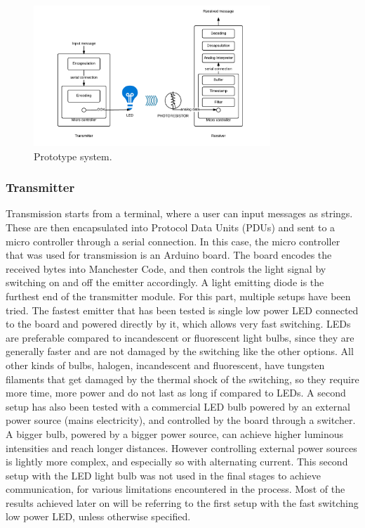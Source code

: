 \begin{figure}
\centering
\includegraphics[height=200px]{img/sysover}
\caption{Prototype system.}
\label{fig:sys over}
\end{figure}

\subsubsection{Transmitter}
Transmission starts from a terminal, where a user can input messages as strings. These are then encapsulated into Protocol Data Units (PDUs) and sent to a micro controller through a serial connection.
In this case, the micro controller that was used for transmission is an Arduino board.
The board encodes the received bytes into Manchester Code, and then controls the light signal by switching on and off the emitter accordingly.
A light emitting diode is the furthest end of the transmitter module.
For this part, multiple setups have been tried.
The fastest emitter that has been tested is single low power LED connected to the board and powered directly by it, which allows very fast switching.
LEDs are preferable compared to incandescent or fluorescent light bulbs, since they are generally faster and are not damaged by the switching like the other options.
All other kinds of bulbs, halogen, incandescent and fluorescent, have tungsten filaments that get damaged by the thermal shock of the switching, so they require more time, more power and do not last as long if compared to LEDs.
A second setup has also been tested with a commercial LED bulb powered by an external power source (mains electricity), and controlled by the board through a switcher. 
A bigger bulb, powered by a bigger power source, can achieve higher luminous intensities and reach longer distances.
However controlling external power sources is lightly more complex, and especially so with alternating current.
This second setup with the LED light bulb was not used in the final stages to achieve communication, for various limitations encountered in the process.
Most of the results achieved later on will be referring to the first setup with the fast switching low power LED, unless otherwise specified.


